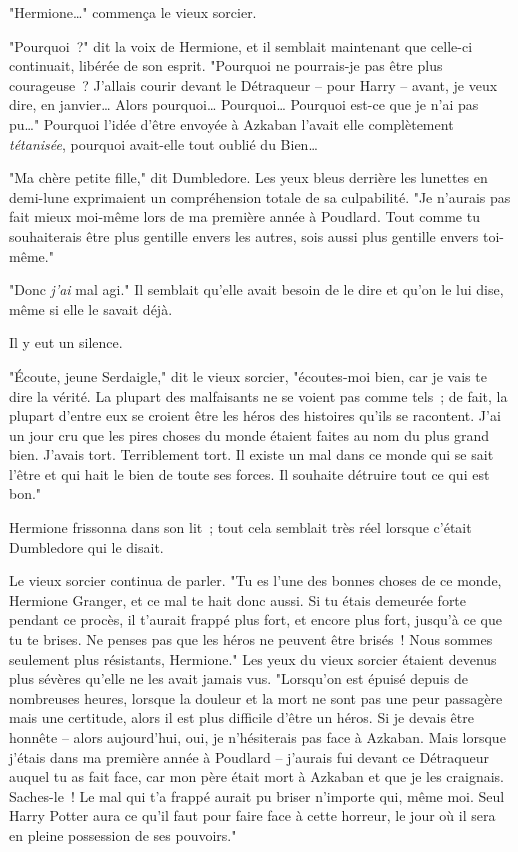 "Hermione…" commença le vieux sorcier.

"Pourquoi~?" dit la voix de Hermione, et il semblait maintenant que celle-ci continuait, libérée de son esprit. "Pourquoi ne pourrais-je pas être plus courageuse~? J'allais courir devant le Détraqueur -- pour Harry -- avant, je veux dire, en janvier… Alors pourquoi… Pourquoi… Pourquoi est-ce que je n'ai pas pu…" Pourquoi l'idée d'être envoyée à Azkaban l'avait elle complètement \emph{tétanisée}, pourquoi avait-elle tout oublié du Bien…

"Ma chère petite fille," dit Dumbledore. Les yeux bleus derrière les lunettes en demi-lune exprimaient un compréhension totale de sa culpabilité. "Je n'aurais pas fait mieux moi-même lors de ma première année à Poudlard. Tout comme tu souhaiterais être plus gentille envers les autres, sois aussi plus gentille envers toi-même."

"Donc \emph{j'ai} mal agi." Il semblait qu'elle avait besoin de le dire et qu'on le lui dise, même si elle le savait déjà.

Il y eut un silence.

"Écoute, jeune Serdaigle," dit le vieux sorcier, "écoutes-moi bien, car je vais te dire la vérité. La plupart des malfaisants ne se voient pas comme tels~; de fait, la plupart d'entre eux se croient être les héros des histoires qu'ils se racontent. J'ai un jour cru que les pires choses du monde étaient faites au nom du plus grand bien. J'avais tort. Terriblement tort. Il existe un mal dans ce monde qui se sait l'être et qui hait le bien de toute ses forces. Il souhaite détruire tout ce qui est bon."

Hermione frissonna dans son lit~; tout cela semblait très réel lorsque c'était Dumbledore qui le disait.

Le vieux sorcier continua de parler. "Tu es l'une des bonnes choses de ce monde, Hermione Granger, et ce mal te hait donc aussi. Si tu étais demeurée forte pendant ce procès, il t'aurait frappé plus fort, et encore plus fort, jusqu'à ce que tu te brises. Ne penses pas que les héros ne peuvent être brisés~! Nous sommes seulement plus résistants, Hermione." Les yeux du vieux sorcier étaient devenus plus sévères qu'elle ne les avait jamais vus. "Lorsqu'on est épuisé depuis de nombreuses heures, lorsque la douleur et la mort ne sont pas une peur passagère mais une certitude, alors il est plus difficile d'être un héros. Si je devais être honnête -- alors aujourd'hui, oui, je n'hésiterais pas face à Azkaban. Mais lorsque j'étais dans ma première année à Poudlard -- j'aurais fui devant ce Détraqueur auquel tu as fait face, car mon père était mort à Azkaban et que je les craignais. Saches-le~! Le mal qui t'a frappé aurait pu briser n'importe qui, même moi. Seul Harry Potter aura ce qu'il faut pour faire face à cette horreur, le jour où il sera en pleine possession de ses pouvoirs."

